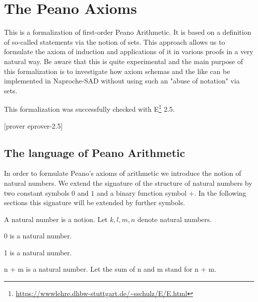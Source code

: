 \section{The Peano Axioms}
This is a formalization of first-order Peano Arithmetic. It is based on a
definition of so-called statements via the notion of sets. This approach
allows us to formulate the axiom of induction and applications of it in various proofs
in a very natural way. Be aware that this is quite experimental and the main
purpose of this formalization is to investigate how axiom schemas and the like can be implemented in Naproche-SAD without using such an "abuse of notation" via sets.

This formalization was successfully checked with E\footnote{\url{https://wwwlehre.dhbw-stuttgart.de/~sschulz/E/E.html}} 2.5.

\begin{forthel}

[prover eprover-2.5]
\end{forthel}

\subsection{The language of Peano Arithmetic}
In order to formulate Peano's axioms of arithmetic we introduce the notion of
natural numbers. We extend the signature of the structure of natural numbers by
two constant symbols $0$ and $1$ and a binary function symbol $+$. In the following
sections this signature will be extended by further symbols.

\begin{forthel}
\begin{signature}[0101]
A natural number is a notion. Let $k,l,m,n$ denote natural
numbers.
\end{signature}

\begin{signature}[0102]
0 is a natural number.
\end{signature}

\begin{signature}[0103]
1 is a natural number.
\end{signature}

\begin{signature}[0104]
n + m is a natural number. Let the sum of n and m stand for
n + m.
\end{signature}
\end{forthel}

